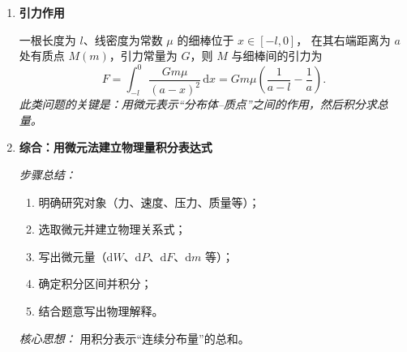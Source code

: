 \begin{enumerate}
          \vspace{0.5em}

    \item \textbf{引力作用}

          一根长度为 $l$、线密度为常数 $\mu$ 的细棒位于 $x\in[-l,0]$，
          在其右端距离为 $a$ 处有质点 $M(m)$，引力常量为 $G$，则 $M$ 与细棒间的引力为
          $$
              F = \int_{-l}^{0} \frac{Gm\mu}{(a-x)^2}\,\mathrm{d}x
              = Gm\mu\!\left(\frac{1}{a-l} - \frac{1}{a}\right).
          $$
          \textit{此类问题的关键是：用微元表示“分布体–质点”之间的作用，然后积分求总量。}

          \vspace{0.5em}

    \item \textbf{综合：用微元法建立物理量积分表达式}

          \textit{步骤总结：}
          \begin{enumerate}[label=(\arabic*)]
              \item 明确研究对象（力、速度、压力、质量等）；
              \item 选取微元并建立物理关系式；
              \item 写出微元量（$\mathrm{d}W$、$\mathrm{d}P$、$\mathrm{d}F$、$\mathrm{d}m$ 等）；
              \item 确定积分区间并积分；
              \item 结合题意写出物理解释。
          \end{enumerate}
          \textit{核心思想：} 用积分表示“连续分布量”的总和。
\end{enumerate}